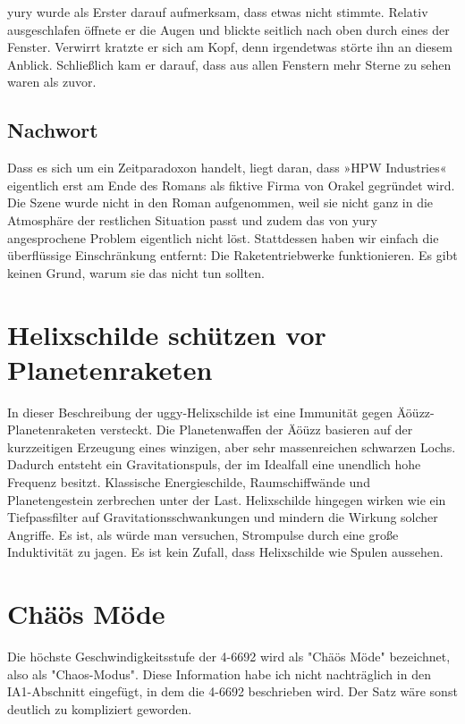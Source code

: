 yury wurde als Erster darauf aufmerksam, dass etwas nicht stimmte. Relativ ausgeschlafen öffnete er die Augen und blickte seitlich nach oben durch eines der Fenster. Verwirrt kratzte er sich am Kopf, denn irgendetwas störte ihn an diesem Anblick. Schließlich kam er darauf, dass aus allen Fenstern mehr Sterne zu sehen waren als zuvor.

\section{Nachwort}

Dass es sich um ein Zeitparadoxon handelt, liegt daran, dass »HPW Industries« eigentlich erst am Ende des Romans als fiktive Firma von Orakel gegründet wird. Die Szene wurde nicht in den Roman aufgenommen, weil sie nicht ganz in die Atmosphäre der restlichen Situation passt und zudem das von yury angesprochene Problem eigentlich nicht löst. Stattdessen haben wir einfach die überflüssige Einschränkung entfernt: Die Raketentriebwerke funktionieren. Es gibt keinen Grund, warum sie das nicht tun sollten.

\chapter{Helixschilde schützen vor Planetenraketen}


In dieser Beschreibung der uggy-Helixschilde ist eine Immunität gegen Äöüzz-Planetenraketen versteckt. Die Planetenwaffen der Äöüzz basieren auf der kurzzeitigen Erzeugung eines winzigen, aber sehr massenreichen schwarzen Lochs. Dadurch entsteht ein Gravitationspuls, der im Idealfall eine unendlich hohe Frequenz besitzt. Klassische Energieschilde, Raumschiffwände und Planetengestein zerbrechen unter der Last. Helixschilde hingegen wirken wie ein Tiefpassfilter auf Gravitationsschwankungen und mindern die Wirkung solcher Angriffe. Es ist, als würde man versuchen, Strompulse durch eine große Induktivität zu jagen. Es ist kein Zufall, dass Helixschilde wie Spulen aussehen.


\chapter{Chäös Möde}


Die höchste Geschwindigkeitsstufe der 4-6692 wird als "Chäös Möde" bezeichnet, also als "Chaos-Modus". Diese Information habe ich nicht nachträglich in den IA1-Abschnitt eingefügt, in dem die 4-6692 beschrieben wird. Der Satz wäre sonst deutlich zu kompliziert geworden.

